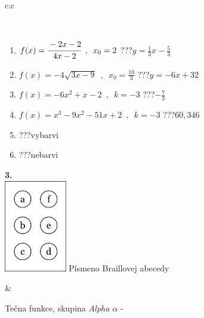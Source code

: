 \documentclass[10pt]{report}
\begin{document}
\begin{tabular}{c:c}
\begin{minipage}[c][104.5mm][t]{0.5\linewidth}
\begin{center}
\begin{minipage}{0.95\linewidth}
\begin{center}
\end{center}
\end{minipage}
\\[1mm]
\begin{minipage}{0.79\linewidth}
\begin{center}
\begin{varwidth}{\linewidth}
\begin{enumerate}
\small
\item $f(x)=\cfrac{-2x-2}{4x-2}\enspace , \enspace x_0=2$\quad \dotfill\; ???\;\dotfill \quad $y = \frac{1}{3}x-\frac{5}{3}$
\item $f(x)=-4\sqrt{3x-9}\enspace , \enspace x_0=\frac{10}{3}$\quad \dotfill\; ???\;\dotfill \quad $y = -6x+32$
\item $f(x)=-6x^2+x-2\enspace , \enspace k=-3$\quad \dotfill\; ???\;\dotfill \quad $-\frac{7}{3}$
\item $f(x)=x^3-9x^2-51x+2\enspace , \enspace k=-3$\quad \dotfill\; ???\;\dotfill \quad $60 , 346$
\item \quad \dotfill\; ???\;\dotfill \quad vybarvi
\item \quad \dotfill\; ???\;\dotfill \quad nebarvi
\end{enumerate}
\end{varwidth}
\end{center}
\end{minipage}
\begin{minipage}{0.20\linewidth}
\begin{center}
{\Huge\bfseries 3.} \\[2mm]
\includegraphics[height=40mm]{../images/braille.png}
{\small Písmeno Braillovej abecedy}
\end{center}
\end{minipage}
\end{center}
\end{minipage}
&
\begin{minipage}[c][104.5mm][t]{0.5\linewidth}
\begin{center}
\vspace{7mm}
{\huge Tečna funkce, skupina \textit{Alpha $\alpha$} -}\\[5mm]

\end{center}
\end{minipage}
\end{tabular}
\end{document}
